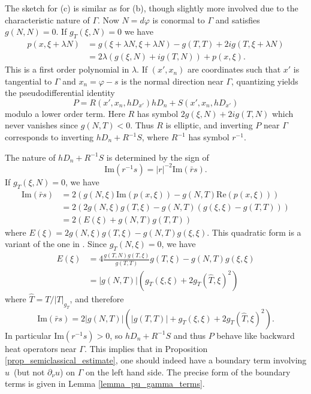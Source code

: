 \documentclass[11pt,letterpaper]{amsart}
\theoremstyle{definition}
\numberwithin{equation}{section}
\newcommand{\p}{\partial}
\def\p{\partial}
\begin{document}
The sketch for (c) is similar as for (b), though slightly more involved due to the characteristic nature of $\Gamma$. Now $N = d\varphi$ is conormal to $\Gamma$ and satisfies $g(N, N) = 0$. If $g_T(\xi, N) = 0$ we have 
\begin{align*}
p(x, \xi + \lambda N) &= g(\xi+\lambda N, \xi + \lambda N) - g(T,T) + 2i g(T, \xi + \lambda N) \\
 &= 2 \lambda (g(\xi, N) + i g(T, N)) + p(x,\xi).
\end{align*}
This is a first order polynomial in $\lambda$. If $(x',x_n)$ are coordinates such that $x'$ is tangential to $\Gamma$ and $x_n = \varphi-s$ is the normal direction near $\Gamma$, quantizing yields the pseudodifferential identity 
\[
P = R(x',x_n,hD_{x'}) hD_n + S(x',x_n, hD_{x'})
\]
modulo a lower order term. Here $R$ has symbol $2 g(\xi, N) + 2 i g(T, N)$ which never vanishes since $g(N, T) < 0$. Thus $R$ is elliptic, and inverting $P$ near $\Gamma$ corresponds to inverting $hD_n + R^{-1} S$, where $R^{-1}$ has symbol $r^{-1}$.

The nature of $hD_n + R^{-1} S$ is determined by the sign of 
\[
\mathrm{Im}(r^{-1} s) = |r|^{-2} \mathrm{Im}(\bar{r} s).
\]
If $g_T(\xi, N) = 0$, we have 
\begin{align*}
\mathrm{Im}(\bar{r} s) &= 2 (g(N, \xi) \mathrm{Im}(p(x,\xi)) - g(N,T) \mathrm{Re}(p(x,\xi))) \\
 &=  2 ( 2 g(N, \xi) g(T, \xi) - g(N,T)(g(\xi,\xi) - g(T,T)) ) \\
 &= 2 ( E(\xi) + g(N,T) g(T,T))
\end{align*}
where $E(\xi) = 2 g(N, \xi) g(T, \xi) - g(N,T) g(\xi,\xi)$. This quadratic form is a variant of the one in \cite[Lemma 24.1.2]{hormander}. Since $g_T(N, \xi) = 0$, we have 
\begin{align*}
E(\xi) &= 4 \frac{g(T,N) g(T,\xi)}{g(T,T)} g(T,\xi) - g(N,T) g(\xi,\xi) \\
 &= |g(N,T)| (g_T(\xi,\xi) +  2 g_T(\hat{T},\xi)^2)
\end{align*}
where $\hat{T} = T/|T|_{g_T}$, and therefore 
\[
\mathrm{Im}(\bar{r} s) = 2 |g(N,T)| (|g(T,T)| + g_T(\xi,\xi) + 2 g_T(\hat{T},\xi)^2).
\]
In particular $\mathrm{Im}(r^{-1} s) > 0$, so $hD_n + R^{-1} S$ and thus $P$ behave like backward heat operators near $\Gamma$. This implies that in Proposition \ref{prop_semiclassical_estimate}, one should indeed have a boundary term involving $u$ (but not $\p_{\nu} u$) on $\Gamma$ on the left hand side. The precise form of the boundary terms is given in Lemma \ref{lemma_pu_gamma_terms}.
\end{document}
